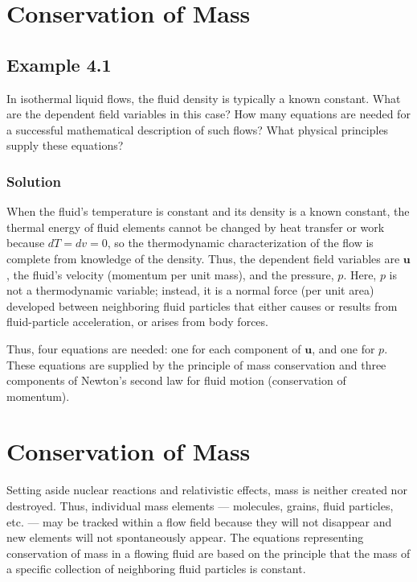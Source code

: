 \documentclass{article}
\begin{document}
\section{Conservation of Mass}

\subsection*{Example 4.1}

In isothermal liquid flows, the fluid density is typically a known constant. What are the dependent field variables in this case? How many equations are needed for a successful mathematical description of such flows? What physical principles supply these equations?

\subsubsection*{Solution}

When the fluid’s temperature is constant and its density is a known constant, the thermal energy of fluid elements cannot be changed by heat transfer or work because \(dT = dv = 0\), so the thermodynamic characterization of the flow is complete from knowledge of the density. Thus, the dependent field variables are \( \mathbf{u} \), the fluid’s velocity (momentum per unit mass), and the pressure, \( p \). Here, \( p \) is not a thermodynamic variable; instead, it is a normal force (per unit area) developed between neighboring fluid particles that either causes or results from fluid-particle acceleration, or arises from body forces. 

Thus, four equations are needed: one for each component of \( \mathbf{u} \), and one for \( p \). These equations are supplied by the principle of mass conservation and three components of Newton’s second law for fluid motion (conservation of momentum).

\section{Conservation of Mass}

Setting aside nuclear reactions and relativistic effects, mass is neither created nor destroyed. Thus, individual mass elements — molecules, grains, fluid particles, etc. — may be tracked within a flow field because they will not disappear and new elements will not spontaneously appear. The equations representing conservation of mass in a flowing fluid are based on the principle that the mass of a specific collection of neighboring fluid particles is constant.
\end{document}
